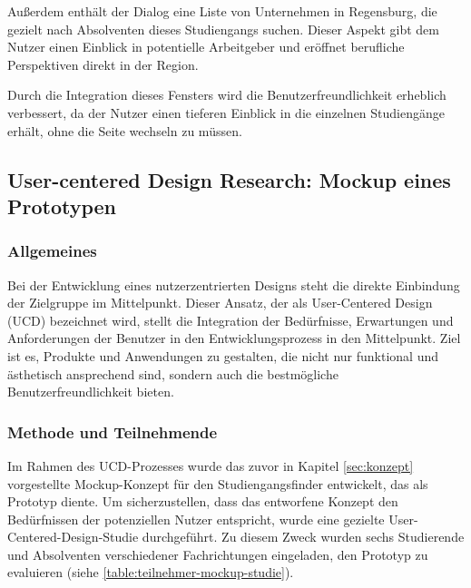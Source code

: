 Außerdem enthält der Dialog eine Liste von Unternehmen in Regensburg, die
gezielt nach Absolventen dieses Studiengangs suchen. Dieser Aspekt gibt dem
Nutzer einen Einblick in potentielle Arbeitgeber und eröffnet berufliche
Perspektiven direkt in der Region.

Durch die Integration dieses Fensters wird die Benutzerfreundlichkeit erheblich 
verbessert, da der Nutzer einen tieferen Einblick in die einzelnen Studiengänge
erhält, ohne die Seite wechseln zu müssen.

\subsection{User-centered Design Research: Mockup eines Prototypen}

\subsubsection{Allgemeines}
Bei der Entwicklung eines nutzerzentrierten Designs steht die direkte Einbindung
der Zielgruppe im Mittelpunkt. Dieser Ansatz, der als User-Centered Design (UCD) 
bezeichnet wird, stellt die Integration der Bedürfnisse, Erwartungen und
Anforderungen der Benutzer in den Entwicklungsprozess in den Mittelpunkt. Ziel
ist es, Produkte und Anwendungen zu gestalten, die nicht nur funktional und
ästhetisch ansprechend sind, sondern auch die bestmögliche
Benutzerfreundlichkeit bieten.

\subsubsection{Methode und Teilnehmende}
Im Rahmen des UCD-Prozesses wurde das zuvor in Kapitel \ref{sec:konzept}
vorgestellte Mockup-Konzept für den Studiengangsfinder entwickelt, das als
Prototyp diente. Um sicherzustellen, dass das entworfene Konzept den
Bedürfnissen der potenziellen Nutzer entspricht, wurde eine gezielte 
User-Centered-Design-Studie durchgeführt. Zu diesem Zweck wurden sechs
Studierende und Absolventen verschiedener Fachrichtungen eingeladen, den
Prototyp zu evaluieren (siehe \autoref{table:teilnehmer-mockup-studie}).

